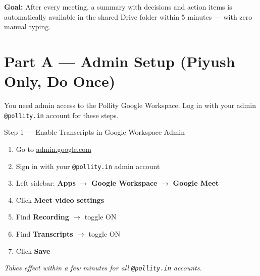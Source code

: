\documentclass[11pt, a4paper]{article}
\begin{document}
\vspace{1em}
\begin{notebox}
\textbf{Goal:} After every meeting, a summary with decisions and action items is automatically available in the shared Drive folder within 5 minutes --- with zero manual typing.
\end{notebox}

\newpage

\section{Part A — Admin Setup (Piyush Only, Do Once)}

\begin{notebox}
You need admin access to the Pollity Google Workspace. Log in with your admin \texttt{@pollity.in} account for these steps.
\end{notebox}

\vspace{0.5em}

\begin{stepbox}{Step 1 — Enable Transcripts in Google Workspace Admin}
\begin{enumerate}[leftmargin=1.5em]
  \item Go to \href{https://admin.google.com}{admin.google.com}
  \item Sign in with your \texttt{@pollity.in} admin account
  \item Left sidebar: \textbf{Apps} $\to$ \textbf{Google Workspace} $\to$ \textbf{Google Meet}
  \item Click \textbf{Meet video settings}
  \item Find \textbf{Recording} $\to$ toggle ON
  \item Find \textbf{Transcripts} $\to$ toggle ON
  \item Click \textbf{Save}
\end{enumerate}
\textit{Takes effect within a few minutes for all \texttt{@pollity.in} accounts.}
\end{stepbox}

\vspace{1em}
\end{document}

